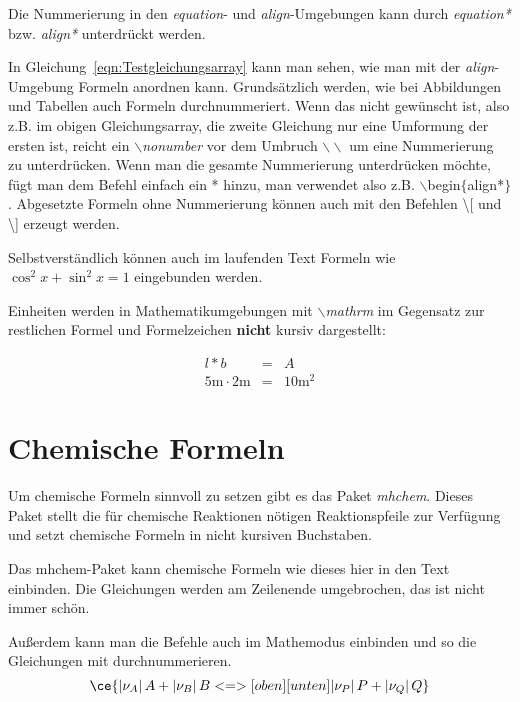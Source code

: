 Die Nummerierung in den \emph{equation}- und \emph{align}-Umgebungen kann durch \emph{equation*} bzw. \emph{align*} unterdrückt werden.

In Gleichung~\ref{eqn:Testgleichungsarray} kann man sehen, wie man mit der \emph{align}-Umgebung Formeln anordnen kann. Grundsätzlich werden, wie bei
Abbildungen und Tabellen auch Formeln durchnummeriert. Wenn das nicht gewünscht ist, also z.B. im obigen Gleichungsarray, die
zweite Gleichung nur eine Umformung der ersten ist, reicht ein \emph{$\backslash$nonumber} vor dem Umbruch \emph{$\backslash\backslash$} um eine Nummerierung zu
unterdrücken. Wenn man die gesamte Nummerierung unterdrücken möchte, fügt man dem Befehl einfach ein * hinzu, man verwendet also z.B. $\backslash$begin$\{$align*$\}$.
Abgesetzte Formeln ohne Nummerierung können auch mit den Befehlen \textbackslash [ und \textbackslash ] erzeugt werden. 

Selbstverständlich können auch im laufenden Text Formeln wie
$\cos^{2}{x}+\sin^{2}{x}=1$ eingebunden werden.

Einheiten werden in Mathematikumgebungen mit
\emph{$\backslash$mathrm} im Gegensatz zur restlichen Formel und
Formelzeichen \textbf{nicht} kursiv dargestellt:

\begin{eqnarray}
  l * b &=& A \\
  5 \mathrm{m} \cdot 2 \mathrm{m} &=& 10 \mathrm{m^{2}}
\end{eqnarray}

\section{Chemische Formeln}

	Um chemische Formeln sinnvoll zu setzen gibt es das Paket \emph{mhchem}. Dieses Paket stellt die für chemische Reaktionen nötigen Reaktionspfeile zur Verfügung 
	und setzt chemische Formeln in nicht kursiven Buchstaben.
	
	Das mhchem-Paket kann chemische Formeln wie dieses hier  in den Text einbinden. 
	Die Gleichungen werden am Zeilenende umgebrochen, das ist nicht immer schön. 
	
	Außerdem kann man die Befehle auch im Mathemodus einbinden und so die Gleichungen mit durchnummerieren. 
		\begin{equation}
			\ce{|\nu_A|\, A + |\nu_B|\, B <=>[oben][unten] |\nu_P|\, P + |\nu_Q|\, Q}
		\end{equation}
	
